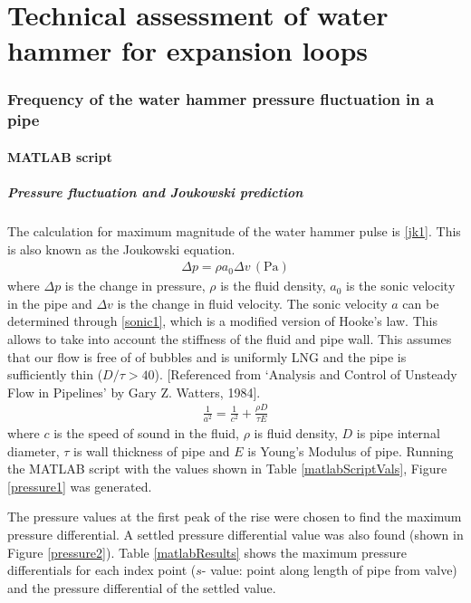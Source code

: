 \part{Technical assessment of water hammer for expansion loops}
\section{Frequency of the water hammer pressure fluctuation in a pipe}
\subsection{MATLAB script}
\subsubsection{Pressure fluctuation and Joukowski prediction}
The calculation for maximum magnitude of the water hammer pulse is \eqref{jk1}. This is also known as the Joukowski equation.
\begin{gather}\label{jk1}
    \Delta p = \rho a_0 \Delta v\, (\si{\pascal})
\end{gather}
where $\Delta p$ is the change in pressure, $\rho$ is the fluid density, $a_0$ is the sonic velocity in the pipe and $\Delta v$ is the change in fluid velocity. The sonic velocity $a$ can be determined through \eqref{sonic1}, which is a modified version of Hooke's law. This allows to take into account the stiffness of the fluid and pipe wall. This assumes that our flow is free of of bubbles and is uniformly LNG and the pipe is sufficiently thin ($D/\tau > 40$). [Referenced from `Analysis and Control of Unsteady Flow in Pipelines' by Gary Z. Watters, 1984].
\begin{gather}\label{sonic1}
    \frac{1}{a^2} = \frac{1}{c^2} + \frac{\rho D }{\tau E}
\end{gather}
where $c$ is the speed of sound in the fluid, $\rho$ is fluid density, $D$ is pipe internal diameter, $\tau$ is wall thickness of pipe and $E$ is Young's Modulus of pipe. Running the MATLAB script with the values shown in Table \ref{matlabScriptVals}, Figure \ref{pressure1} was generated.

The pressure values at the first peak of the rise were chosen to find the maximum pressure differential. A settled pressure differential value was also found (shown in Figure \ref{pressure2}). Table \ref{matlabResults} shows the maximum pressure differentials for each index point ($s$- value: point along length of pipe from valve) and the pressure differential of the settled value.

